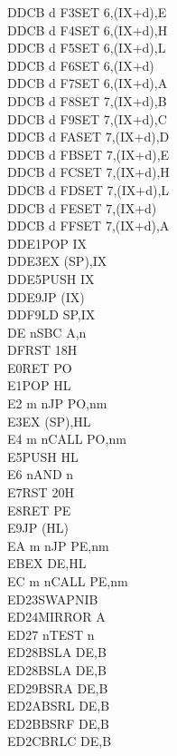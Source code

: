 \begin{multicols}{3}
{\begin{tabbing}
	DDCB d F3\>SET 6,(IX+d),E\UNDOC\\
	DDCB d F4\>SET 6,(IX+d),H\UNDOC\\
	DDCB d F5\>SET 6,(IX+d),L\UNDOC\\
	DDCB d F6\>SET 6,(IX+d)\\
	DDCB d F7\>SET 6,(IX+d),A\UNDOC\\
	DDCB d F8\>SET 7,(IX+d),B\UNDOC\\
	DDCB d F9\>SET 7,(IX+d),C\UNDOC\\
	DDCB d FA\>SET 7,(IX+d),D\UNDOC\\
	DDCB d FB\>SET 7,(IX+d),E\UNDOC\\
	DDCB d FC\>SET 7,(IX+d),H\UNDOC\\
	DDCB d FD\>SET 7,(IX+d),L\UNDOC\\
	DDCB d FE\>SET 7,(IX+d)\\
	DDCB d FF\>SET 7,(IX+d),A\UNDOC\\
	DDE1\>POP IX\\
	DDE3\>EX (SP),IX\\
	DDE5\>PUSH IX\\
	DDE9\>JP (IX)\\
	DDF9\>LD SP,IX\\
	DE n\>SBC A,n\\
	DF\>RST 18H\\
	E0\>RET PO\\
	E1\>POP HL\\
	E2 m n\>JP PO,nm\\
	E3\>EX (SP),HL\\
	E4 m n\>CALL PO,nm\\
	E5\>PUSH HL\\
	E6 n\>AND n\\
	E7\>RST 20H\\
	E8\>RET PE\\
	E9\>JP (HL)\\
	EA m n\>JP PE,nm\\
	EB\>EX DE,HL\\
	EC m n\>CALL PE,nm\\
	ED23\>SWAPNIB\ZXN\\
	ED24\>MIRROR A\ZXN\\
	ED27 n\>TEST n\ZXN\\
	ED28\>BSLA DE,B\ZXN\\
	ED28\>BSLA DE,B\ZXN\\
	ED29\>BSRA DE,B\ZXN\\
	ED2A\>BSRL DE,B\ZXN\\
	ED2B\>BSRF DE,B\ZXN\\
	ED2C\>BRLC DE,B\ZXN\\

\end{tabbing}}
\end{multicols}
